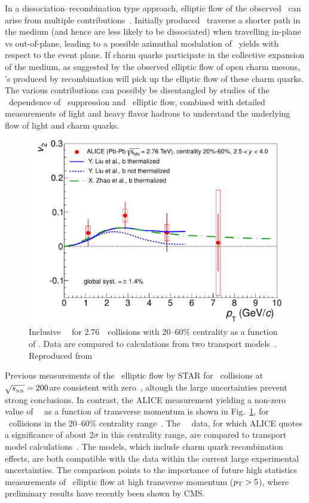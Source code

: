 In a dissociation--recombination type approach, elliptic flow of the observed \jpsi\ can
arise from multiple contributions~\cite{ALICE:2013xna}. Initially produced \jpsi\ traverse a shorter path
in the medium (and hence are less likely to be dissociated) when travelling in-plane vs
out-of-plane, leading to a possible azimuthal modulation of \jpsi\ yields with respect
to the event plane. If charm quarks participate in the collective expansion of the medium, as
suggested by the observed elliptic flow of open charm mesons, \jpsi's produced by recombination will
pick up the elliptic flow of these charm quarks. The various contributions can possibly be disentangled
by studies of the \pT\ dependence of \jpsi\ suppression and \jpsi\ elliptic flow, combined with
detailed measurements of light and heavy flavor hadrons to understand the underlying flow of
light and charm quarks.

\begin{figure}
\begin{center}
\includegraphics[width=0.49\linewidth]{qqbarfigures/prl_fig4-eps-converted-to.pdf}
\caption{\label{fig:GR:v2ptcomp} Inclusive \jpsi\ \vtwo\
for 2.76\TeV\ \PbPb\ collisions with 20--60\% centrality as a function of \pT.
Data are compared to calculations from two transport models~\cite{Liu:2009gx,Zhao:2012gc}.
Reproduced from~\cite{ALICE:2013xna}}
\end{center}
\end{figure}
Previous measurements of the \jpsi\ elliptic flow by STAR for \AuAu\ collisions at
$\sqrt{s_{_{\rm NN}}} = 200$\GeV are consistent with zero~\cite{Adamczyk:2012pw},
altough the large uncertainties prevent strong conclusions.
In contrast, the ALICE measurement yielding a non-zero value of \jpsi\ \vtwo\ as a function
of transverse momentum is shown in Fig.~\ref{fig:GR:v2ptcomp}, for \PbPb\ collisions in the 20--60\%
centrality range~\cite{ALICE:2013xna}.
The \jpsi\ \vtwo\ data, for which ALICE quotes a significance of about 2$\sigma$ in this centrality range,
are compared to transport model calculations~\cite{Liu:2009gx,Zhao:2012gc}.
The models, which include charm quark recombination effects,
are both compatible with the data within the current large experimental uncertainties.
The comparison points to the importance of future high statistics measurements
of \jpsi\ elliptic flow at high transverse momentum ($\mbox{$p_{\mathrm{T}}$} > 5$\GeVc), where
preliminary results have recently been shown by CMS.

